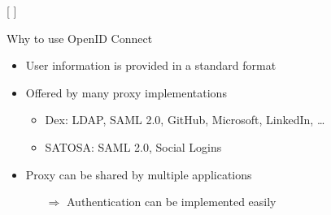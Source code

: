 \documentclass[aspectratio=169]{beamer}
\begin{document}
[
	\label{demo}
]

\begin{frame}{Why to use OpenID Connect}
	\begin{itemize}
		\item User information is provided in a standard format
		\item Offered by many proxy implementations
		\begin{itemize}
			\item Dex: LDAP, SAML 2.0, GitHub, Microsoft, LinkedIn, \dots
			\item SATOSA: SAML 2.0, Social Logins
		\end{itemize}
		\item Proxy can be shared by multiple applications
		\begin{itemize}
			\item[$\Rightarrow$] Authentication can be implemented easily 
		\end{itemize}
	\end{itemize}
\end{frame}
\end{document}
